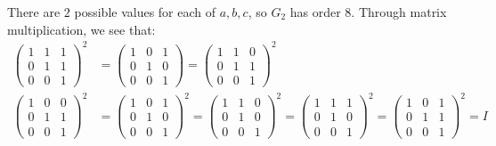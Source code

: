 \begin{enumalph}
    \begin{Answer}
      There are $2$ possible values for each of $a, b, c$,
      so $G_2$ has order $8$.
      Through matrix multiplication, we see that:
      \begin{align*}
        \begin{pmatrix}
          1 & 1 & 1 \\
          0 & 1 & 1 \\
          0 & 0 & 1
        \end{pmatrix}^2 &=
        \begin{pmatrix}
          1 & 0 & 1 \\
          0 & 1 & 0 \\
          0 & 0 & 1
        \end{pmatrix} =
        \begin{pmatrix}
          1 & 1 & 0 \\
          0 & 1 & 1 \\
          0 & 0 & 1
        \end{pmatrix}^2 \\
        \begin{pmatrix}
          1 & 0 & 0 \\
          0 & 1 & 1 \\
          0 & 0 & 1
        \end{pmatrix}^2 &=
        \begin{pmatrix}
          1 & 0 & 1 \\
          0 & 1 & 0 \\
          0 & 0 & 1
        \end{pmatrix}^2 =
        \begin{pmatrix}
          1 & 1 & 0 \\
          0 & 1 & 0 \\
          0 & 0 & 1
        \end{pmatrix}^2 =
        \begin{pmatrix}
          1 & 1 & 1 \\
          0 & 1 & 0 \\
          0 & 0 & 1
        \end{pmatrix}^2 =
        \begin{pmatrix}
          1 & 0 & 1 \\
          0 & 1 & 1 \\
          0 & 0 & 1
        \end{pmatrix}^2 = I
      \end{align*}


\end{Answer}
\end{enumalph}
